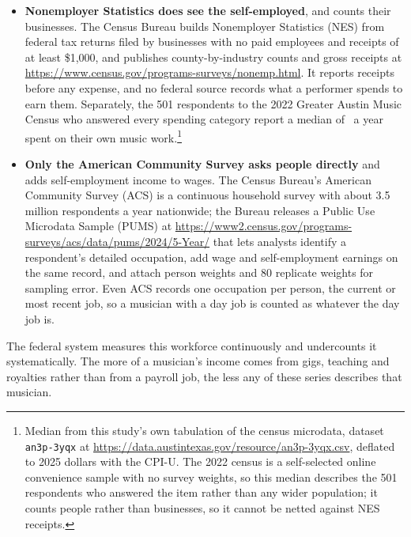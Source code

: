 \begin{sidebar}[title=What the federal statistics can and cannot see]
{\begin{itemize}
\item \textbf{Nonemployer Statistics does see the self-employed}, and counts
their businesses. The Census Bureau builds Nonemployer Statistics (NES) from
federal tax returns filed by businesses with no paid employees and receipts of
at least \$1,000, and publishes county-by-industry counts and gross receipts
at \url{https://www.census.gov/programs-surveys/nonemp.html}. It reports
receipts before any expense, and no federal source records what a performer
spends to earn them. Separately, the 501 respondents to the 2022 Greater
Austin Music Census who answered every spending category report a median of
\NCensusSpendTotalMedian\ a year spent on their own music
work.\footnote{Median from this study's own tabulation of the census
microdata, dataset \texttt{an3p-3yqx} at
\url{https://data.austintexas.gov/resource/an3p-3yqx.csv}, deflated to 2025
dollars with the CPI-U. The 2022 census is a self-selected online convenience
sample with no survey weights, so this median describes the 501 respondents
who answered the item rather than any wider population; it counts people
rather than businesses, so it cannot be netted against NES receipts.}

\item \textbf{Only the American Community Survey asks people directly} and
adds self-employment income to wages. The Census Bureau's American Community
Survey (ACS) is a continuous household survey with about 3.5 million
respondents a year nationwide; the Bureau releases a Public Use Microdata
Sample (PUMS) at
\url{https://www2.census.gov/programs-surveys/acs/data/pums/2024/5-Year/} that
lets analysts identify a respondent's detailed occupation, add wage and
self-employment earnings on the same record, and attach person weights and 80
replicate weights for sampling error. Even ACS records one occupation per
person, the current or most recent job, so a musician with a day job is
counted as whatever the day job is.
\end{itemize}

\smallskip
The federal system measures this workforce continuously and undercounts it
systematically. The more of a musician's income comes from gigs, teaching and
royalties rather than from a payroll job, the less any of these series describes
that musician.}
\end{sidebar}

